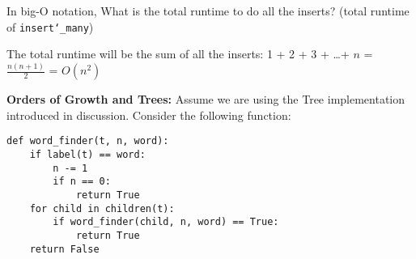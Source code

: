 \documentclass{exam}
\begin{document}
\begin{questions}
\begin{blocksection}
\begin{parts}
\begin{subparts}
\subpart In big-O notation, What is the total runtime to do all the inserts?
(total runtime of \texttt{insert\char`_many})
\begin{solution}[0.25in]
The total runtime will be the sum of all the inserts: 1 + 2 + 3 + \ldots + $n$ =
$\frac{n (n + 1)}{2}$ = $O(n^{2})$
\end{solution}

\end{subparts}

\end{parts}
\end{blocksection}

\begin{blocksection}
\question \textbf{Orders of Growth and Trees:} Assume we are using the Tree
implementation introduced in discussion. Consider the following function:
\begin{lstlisting}
def word_finder(t, n, word):
    if label(t) == word:
        n -= 1
        if n == 0:
            return True
    for child in children(t):
        if word_finder(child, n, word) == True:
            return True
    return False
\end{lstlisting}


\end{blocksection}

\end{questions}

\end{document}
